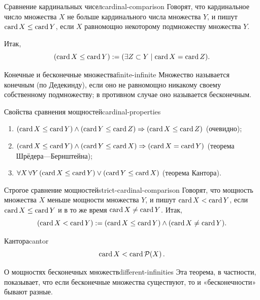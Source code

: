 \begin{definition}{Сравнение кардинальных чисел}{cardinal-comparison}
  Говорят, что кардинальное число множества $X$ не больше кардинального
  числа множества $Y$, и пишут $\operatorname{card} X\le\operatorname{card} Y$, если $X$ равномощно
  некоторому подмножеству множества $Y$.

  Итак,
  \[
    (\operatorname{card} X\le\operatorname{card} Y):=(\exists Z\subset Y\mid\operatorname{card} X=\operatorname{card} Z).
  \]
\end{definition}

\begin{definition}{Конечные и бесконечные множества}{finite-infinite}
  Множество называется конечным (по Дедекинду), если оно не равномощно
  никакому своему собственному подмножеству; в противном случае оно
  называется бесконечным.
\end{definition}

\begin{properties}{Свойства сравнения мощностей}{cardinal-properties}
  \begin{enumerate}[label=\arabic*${}^{\circ}$]
    \item $(\operatorname{card} X\le\operatorname{card} Y)\land(\operatorname{card} Y\le\operatorname{card} Z)
      \Rightarrow(\operatorname{card} X\le\operatorname{card} Z)$ (очевидно);\par
    \item $(\operatorname{card} X\le\operatorname{card} Y)\land(\operatorname{card} Y\le\operatorname{card} X)
      \Rightarrow(\operatorname{card} X=\operatorname{card} Y)$ (теорема Шрёдера—Бернштейна);\par
    \item $\forall X\,\forall Y\,(\operatorname{card} X\le\operatorname{card} Y)
      \lor(\operatorname{card} Y\le\operatorname{card} X)$ (теорема Кантора).
  \end{enumerate}
\end{properties}

\begin{definition}{Строгое сравнение мощностей}{strict-cardinal-comparison}
  Говорят, что мощность множества $X$ меньше мощности множества $Y$, и пишут
  $\operatorname{card} X<\operatorname{card} Y$, если $\operatorname{card} X\le\operatorname{card} Y$ и в то же время
  $\operatorname{card} X\ne\operatorname{card} Y$. Итак,
  \[
    (\operatorname{card} X<\operatorname{card} Y):=(\operatorname{card} X\le\operatorname{card} Y)\land(\operatorname{card} X\ne\operatorname{card} Y).
  \]
\end{definition}

\begin{theorem}{Кантора}{cantor}
  \[
    \operatorname{card} X<\operatorname{card}\mathcal{P}\!\left(X\right).
  \]
\end{theorem}

\begin{corollary}{О мощностях бесконечных множеств}{different-infinities}
  Эта теорема, в частности, показывает, что если бесконечные множества
  существуют, то и «бесконечности» бывают разные.
\end{corollary}

